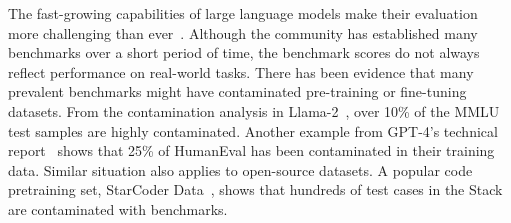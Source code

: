 The fast-growing capabilities of large language models make their evaluation more challenging than ever~\cite{chang2023survey}. 
Although the community has established many benchmarks over a short period of time, the benchmark scores do not always reflect performance on real-world tasks.
There has been evidence that many prevalent benchmarks might have contaminated pre-training or fine-tuning datasets. 
From the contamination analysis in Llama-2~\citep{touvron2023llama}, over 10\% of the MMLU test samples are highly contaminated. Another example from GPT-4's technical report~\citep{openai2023gpt4} shows that 25\% of HumanEval has been contaminated in their training data.
Similar situation also applies to open-source datasets. A popular code pretraining set, StarCoder Data~\citep{li2023starcoder}, shows that hundreds of test cases in the Stack~\citep{kocetkov2022stack} are contaminated with benchmarks.

